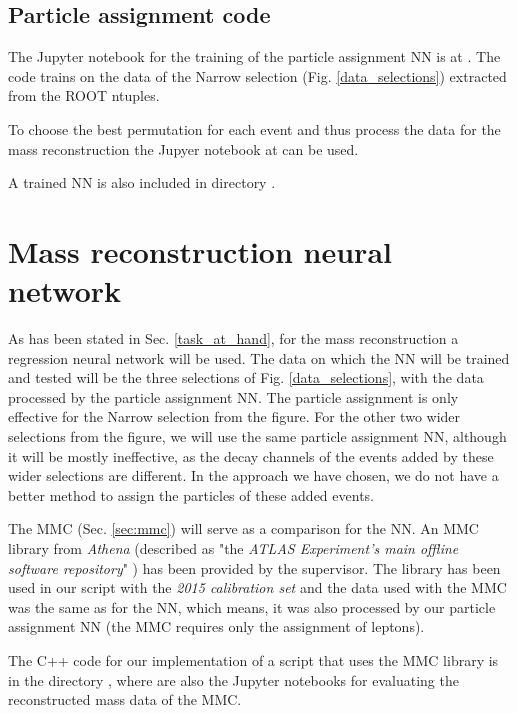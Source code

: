 \documentclass{ctuthesis}
\begin{document}
\subsection{Particle assignment code}
The Jupyter notebook for the training of the particle assignment NN is at \linebreak{}. The code trains on the data of the Narrow selection (Fig. \ref{data_selections}) extracted from the ROOT ntuples.

To choose the best permutation for each event and thus process the data for the mass reconstruction the Jupyer notebook at  can be used.

A trained NN is also included in directory .

\section{Mass reconstruction neural network}
\label{sec:mass_reco}
As has been stated in Sec. \ref{task_at_hand}, for the mass reconstruction a regression neural network will be used. The data on which the NN will be trained and tested will be the three selections of Fig. \ref{data_selections}, with the data processed by the particle assignment NN. The particle assignment is only effective for the Narrow selection from the figure. For the other two wider selections from the figure, we will use the same particle assignment NN, although it will be mostly ineffective, as the decay channels of the events added by these wider selections are different. In the approach we have chosen, we do not have a better method to assign the particles of these added events.

The MMC (Sec. \ref{sec:mmc}) will serve as a comparison for the NN. An MMC library from \emph{Athena} (described as "the \emph{ATLAS Experiment's main offline software repository}" \cite{athena_git}) has been provided by the supervisor. The library has been used in our script with the \emph{2015 calibration set} and the data used with the MMC was the same as for the NN, which means, it was also processed by our particle assignment NN (the MMC requires only the assignment of leptons).

The C++ code for our implementation of a script that uses the MMC library is in the directory , where are also the Jupyter notebooks for evaluating the reconstructed mass data of the MMC.
\end{document}
